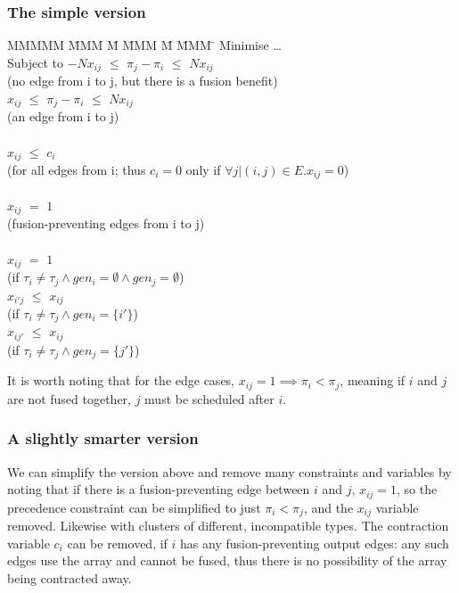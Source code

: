\subsubsection{The simple version}
\begin{tabbing}
MMMMM   \= MMM \= M \= MMM \= M \= MMM \= \kill
Minimise   \> \ldots \\
Subject to \> $-N x_{ij}$ \> $\le$ \> $\pi_j - \pi_i$ \> $\le$ \> $N x_{ij}$ \\
           \>             (no edge from i to j, but there is a fusion benefit)            \\
           \>    $x_{ij}$ \> $\le$ \> $\pi_j - \pi_i$ \> $\le$ \> $N x_{ij}$ \\
           \>             (an edge from i to j)            \\
\\
           \> $x_{ij}$    \> $\le$ \> $c_i$           \>       \>            \\
           \> (for all edges from i; thus $c_i=0$ only if $\forall j | (i,j) \in E. x_{ij} = 0$)      \\
\\
           \> $x_{ij}$    \> $=$   \> $1$             \>       \>            \\
           \> (fusion-preventing edges from i to j)      \\
\\
           \> $x_{ij}$    \> $=$   \> $1$             \>       \>            \\
           \> (if $\tau_i \not= \tau_j \wedge gen_i=\emptyset \wedge gen_j=\emptyset$)                 \\
           \> $x_{i'j}$   \> $\le$ \> $x_{ij}$        \>       \>            \\
           \> (if $\tau_i \not= \tau_j \wedge gen_i=\{i'\}$) \\
           \> $x_{ij'}$   \> $\le$ \> $x_{ij}$        \>       \>            \\
           \> (if $\tau_i \not= \tau_j \wedge gen_j=\{j'\}$) \\
\end{tabbing}
It is worth noting that for the edge cases, $x_{ij} = 1 \implies \pi_i < \pi_j$, meaning if $i$ and $j$ are not fused together, $j$ must be scheduled after $i$.


\subsubsection{A slightly smarter version}
We can simplify the version above and remove many constraints and variables by noting that if there is a fusion-preventing edge between $i$ and $j$, $x_{ij} = 1$, so the precedence constraint can be simplified to just $\pi_i < \pi_j$, and the $x_{ij}$ variable removed.
Likewise with clusters of different, incompatible types.
The contraction variable $c_i$ can be removed, if $i$ has any fusion-preventing output edges: any such edges use the array and cannot be fused, thus there is no possibility of the array being contracted away.

